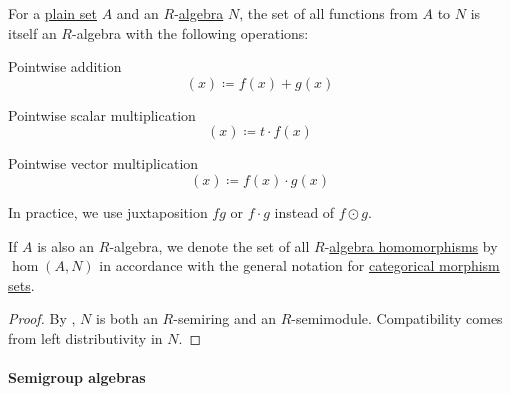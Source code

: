 \begin{proposition}\label{thm:functions_over_algebra}
  For a \hyperref[def:set]{plain set} \( A \) and an \( R \)-\hyperref[def:algebra_over_semiring]{algebra} \( N \), the set of all functions from \( A \) to \( N \) is itself an \( R \)-algebra with the following operations:
  \begin{thmenum}
     Pointwise addition
    \begin{equation*}
      [f + g](x) \coloneqq f(x) + g(x)
    \end{equation*}

     Pointwise scalar multiplication
    \begin{equation*}
      [t \cdot f](x) \coloneqq t \cdot f(x)
    \end{equation*}

     Pointwise vector multiplication
    \begin{equation*}
      [f \odot g](x) \coloneqq f(x) \cdot g(x)
    \end{equation*}

    In practice, we use juxtaposition \( fg \) or \( f \cdot g \) instead of \( f \odot g \).
  \end{thmenum}
\end{proposition}
\begin{comments}
  \item If \( A \) is also an \( R \)-algebra, we denote the set of all \( R \)-\hyperref[def:algebra_over_semiring/homomorphism]{algebra homomorphisms} by \( \hom(A, N) \) in accordance with the general notation for \hyperref[def:category/morphisms]{categorical morphism sets}.
\end{comments}
\begin{proof}
  By , \( N \) is both an \( R \)-semiring and an \( R \)-semimodule. Compatibility comes from left distributivity in \( N \).
\end{proof}

\paragraph{Semigroup algebras}

